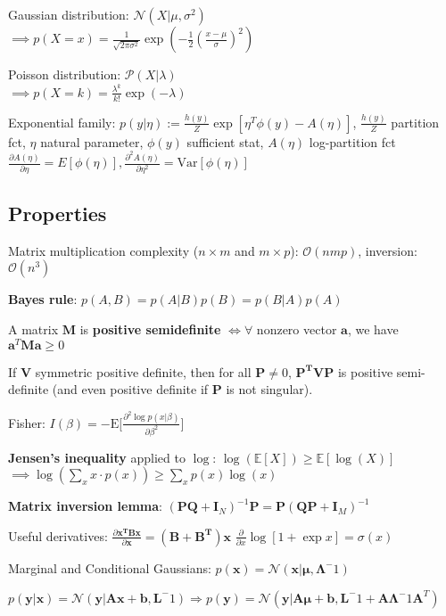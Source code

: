 \documentclass[10pt,a4paper,landscape]{article}
\renewcommand{\bf}[1]{\ensuremath{\mathbf{#1}}}
\newcommand{\E}{\mathrm{E}}
\newcommand{\Var}{\mathrm{Var}}
\begin{document}
\begin{multicols*}{4}
Gaussian distribution: $\mathcal{N}(X| \mu, \sigma^2)$ \\
$\implies p(X = x) = \frac{1}{\sqrt{2 \pi \sigma^2}} \exp{(- \frac{1}{2} ( \frac{x - \mu}{\sigma} )^2)}$

Poisson distribution: $\mathcal{P}(X| \lambda)$ \\
$\implies p(X = k) = \frac{\lambda ^ k}{k!} \exp{(- \lambda)}$

Exponential family: $p(y|\eta) := \frac{h(y)}{Z} \exp[\eta^T \phi(y) - A(\eta)]$, $\frac{h(y)}{Z}$ partition fct, $\eta$ natural parameter, $\phi(y)$ sufficient stat, $A(\eta)$ log-partition fct $\frac{\partial A(\eta)}{\partial \eta} = E[\phi(\eta)], \frac{\partial^2 A(\eta)}{\partial \eta^2} = \Var[\phi(\eta)]$

\subsection{Properties}
Matrix multiplication complexity ($n \times m$ and $m \times p$): $\mathcal{O}(nmp)$, inversion: $\mathcal{O}(n^3)$

\textbf{Bayes rule}: $p(A, B) = p(A|B) p(B) = p(B|A) p(A)$

A matrix $\bf{M}$ is \textbf{positive semidefinite} $\iff \forall$ nonzero vector $\bf{a}$, we have $\bf{a}^T \bf{M} \bf{a} \geq 0$

If $\bf{V}$ symmetric positive definite, then for all $\bf{P} \neq 0$, $\bf{P^T V P}$ is positive semi-definite (and even positive definite if $\bf{P}$ is not singular).

Fisher: $I(\beta) = -\E\biggl[\frac{\partial^2 \log p(x|\beta)}{\partial\beta^2}\biggr]$

\textbf{Jensen's inequality} applied to $\log$: $\log( \mathbb{E}[X] ) \geq \mathbb{E}[\log(X)]$ \\
$\implies \log ( \sum_x x \cdot p(x) ) \geq \sum_x p(x) \log(x)$

\textbf{Matrix inversion lemma}: $(\bf{PQ} + \bf{I}_N)^{-1} \bf{P} = \bf{P}(\bf{QP} + \bf{I}_M)^{-1}$

Useful derivatives: $\frac{\partial \bf{x^T B x}}{\partial \bf{x}} = (\bf{B + B^T}) \bf{x}$
$\frac{\partial}{\partial x} \log[1+\exp{x}] = \sigma(x)$

Marginal and Conditional Gaussians:
$p(\bf{x}) = \mathcal{N}(\bf{x} | \boldsymbol\mu, \boldsymbol\Lambda^-1)$ 

$p(\bf{y}|\bf{x}) = \mathcal{N}(\bf{y} | \bf{Ax + b, L}^-1)
\Rightarrow
p(\bf{y}) = \mathcal{N}(\bf{y} | \bf{A} \boldsymbol\mu + \bf{b}, \bf{L}^-1 + \bf{A} \boldsymbol\Lambda^-1 \bf{A}^T)$


\end{multicols*}
\end{document}
